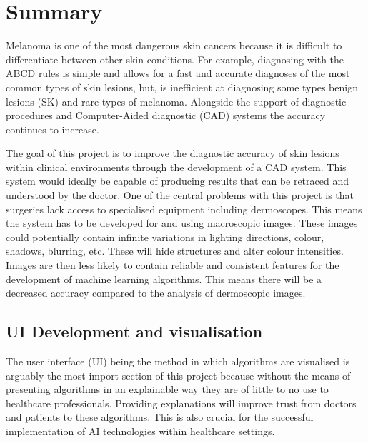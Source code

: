 \section{Summary}
Melanoma is one of the most dangerous skin cancers because it is difficult to differentiate between other skin conditions. For example, diagnosing with the ABCD rules is simple and allows for a fast and accurate diagnoses of the most common types of skin lesions, but, is inefficient at diagnosing some types benign lesions (SK) and rare types of melanoma\cite{Carrera2017}. Alongside the support of diagnostic procedures and Computer-Aided diagnostic (CAD) systems the accuracy continues to increase.

The goal of this project is to improve the diagnostic accuracy of skin lesions within clinical environments through the development of a CAD system. This system would ideally be capable of producing results that can be retraced and understood by the doctor. One of the central problems with this project is that surgeries lack access to specialised equipment including dermoscopes. This means the system has to be developed for and using macroscopic images. These images could potentially contain infinite variations in lighting directions, colour, shadows, blurring, etc. These will hide structures and alter colour intensities. Images are then less likely to contain reliable and consistent features for the development of machine learning algorithms. This means there will be a decreased accuracy compared to the analysis of dermoscopic images.

\subsection{UI Development and visualisation}
The user interface (UI) being the method in which algorithms are visualised is arguably the most import section of this project because without the means of presenting algorithms in an explainable way they are of little to no use to healthcare professionals. Providing explanations will improve trust from doctors and patients to these algorithms\cite{BarredoArrieta2020}. This is also crucial for the successful implementation of AI technologies within healthcare settings\cite{skar2017}.

